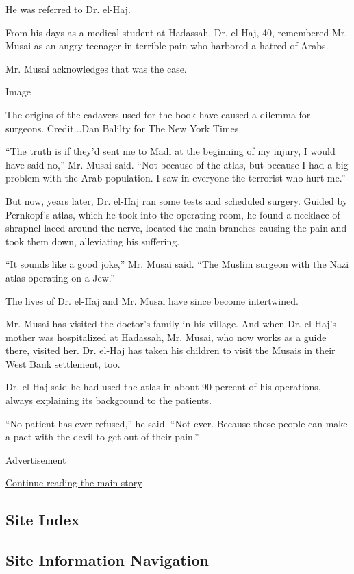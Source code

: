 He was referred to Dr. el-Haj.

From his days as a medical student at Hadassah, Dr. el-Haj, 40,
remembered Mr. Musai as an angry teenager in terrible pain who harbored
a hatred of Arabs.

Mr. Musai acknowledges that was the case.

Image

The origins of the cadavers used for the book have caused a dilemma for
surgeons. Credit...Dan Balilty for The New York Times

``The truth is if they'd sent me to Madi at the beginning of my injury,
I would have said no,'' Mr. Musai said. ``Not because of the atlas, but
because I had a big problem with the Arab population. I saw in everyone
the terrorist who hurt me.''

But now, years later, Dr. el-Haj ran some tests and scheduled surgery.
Guided by Pernkopf's atlas, which he took into the operating room, he
found a necklace of shrapnel laced around the nerve, located the main
branches causing the pain and took them down, alleviating his suffering.

``It sounds like a good joke,'' Mr. Musai said. ``The Muslim surgeon
with the Nazi atlas operating on a Jew.''

The lives of Dr. el-Haj and Mr. Musai have since become intertwined.

Mr. Musai has visited the doctor's family in his village. And when Dr.
el-Haj's mother was hospitalized at Hadassah, Mr. Musai, who now works
as a guide there, visited her. Dr. el-Haj has taken his children to
visit the Musais in their West Bank settlement, too.

Dr. el-Haj said he had used the atlas in about 90 percent of his
operations, always explaining its background to the patients.

``No patient has ever refused,'' he said. ``Not ever. Because these
people can make a pact with the devil to get out of their pain.''

Advertisement

\protect\hyperlink{after-bottom}{Continue reading the main story}

\hypertarget{site-index}{%
\subsection{Site Index}\label{site-index}}

\hypertarget{site-information-navigation}{%
\subsection{Site Information
Navigation}\label{site-information-navigation}}

